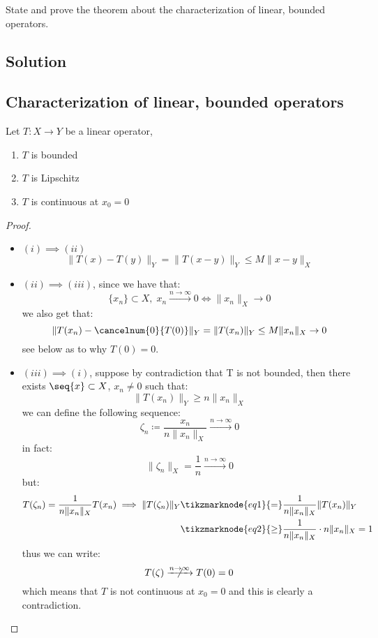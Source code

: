 
\question
State and prove the theorem about the characterization of linear, bounded operators.

\subsection*{Solution}

\subsection{Characterization of linear, bounded operators}
Let $T:X\to Y$ be a linear operator, \tfae
\begin{enumerate}
    \item $T$ is bounded
    \item $T$ is Lipschitz
    \item $T$ is continuous at $x_0=0$
\end{enumerate} 

\begin{proof}
    \hspace*{\fill}\\ %
    \begin{itemize}
        \item $(i) \implies (ii)$
            \[ \|T(x)-T(y)\|_Y = \|T(x-y)\|_Y \leq M \|x-y\|_X \]       
        \item $(ii) \implies (iii)$, since we have that:
            \[ \{x_n\}\subset X, \; x_n\xrightarrow{n\to\infty}0 \iff \|x_n\|_X \to 0 \]
            we also get that:
            \[ \|T(x_n)-\cancelnum{0}{T(0)}\|_Y = \|T(x_n)\|_Y \leq M\|x_n\|_X \to 0\]
            see below as to why $T(0)=0$.
        \item $(iii) \implies (i)$, suppose by contradiction that T is not bounded, then there exists $\seq{x}\subset X$, $x_n\neq0$ such that:
            \[ \|T(x_n)\|_Y \geq n\|x_n\|_X \]
            we can define the following sequence:
            \[ \zeta_n \coloneqq \frac{x_n}{n\|x_n\|_X }\xrightarrow{n\to\infty}0\]
            in fact:
            \[ \|\zeta_n\|_X = \frac{1}{n} \xrightarrow{n\to\infty}0 \]
            but:
            \begin{align*}
                T(\zeta_n) = \frac{1}{n\|x_n\|_X} T(x_n) \implies \|T(\zeta_n)\|_Y & \tikzmarknode{eq1}{=} \frac{1}{n\|x_n\|_X} \|T(x_n)\|_Y \\
                & \tikzmarknode{eq2}{\geq} \frac{1}{n\|x_n\|_X} \cdot n \|x_n\|_X = 1\\
            \end{align*}
            \newpage %
            thus we can write:
            \[ T(\zeta) \centernot{\xrightarrow{n\to\infty}} T(0)=0 \]
            which means that $T$ is not continuous at $x_0=0$ and this is clearly a contradiction.
    \end{itemize}
\end{proof}


